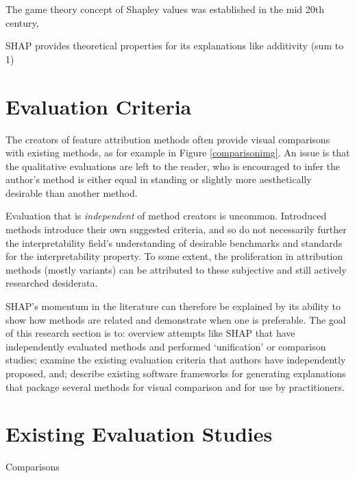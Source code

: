 \documentclass[main]{subfiles}
\begin{document}
The game theory concept of Shapley values was established in the mid 20th century, 

SHAP provides theoretical properties for its explanations like additivity (sum to 1)



\section{Evaluation Criteria}

The creators of feature attribution methods often provide visual comparisons with existing methods, as for example in Figure \ref{comparisonimg}. An issue is that the qualitative evaluations are left to the reader, who is encouraged to infer the author's method is either equal in standing or slightly more aesthetically desirable than another method.

Evaluation that is \textit{independent} of method creators is uncommon. Introduced methods introduce their own suggested criteria, and so do not necessarily further the interpretability field's understanding of desirable benchmarks and standards for the interpretability property. To some extent, the proliferation in attribution methods (mostly variants) can be attributed to these subjective and still actively researched desiderata.

SHAP's momentum in the literature can therefore be explained by its ability to show how methods are related and demonstrate when one is preferable. The goal of this research section is to: overview attempts like SHAP that have independently evaluated methods and performed `unification' or comparison studies; examine the existing evaluation criteria that authors have independently proposed, and; describe existing software frameworks for generating explanations that package several methods for visual comparison and for use by practitioners.

\section{Existing Evaluation Studies}


Comparisons



\end{document}
